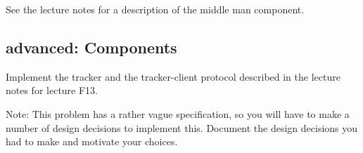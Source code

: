 \documentclass[12pt]{hitec}
\begin{document}
See the lecture notes for a description of the middle man component.

\subsection{advanced: Components}

Implement the tracker and the tracker-client protocol described
in the lecture notes for lecture F13.

Note: This problem has a rather vague specification, so you will have to
make a number of design decisions to implement this. Document the
design decisions you had to make and motivate your choices.
 
\end{document}
